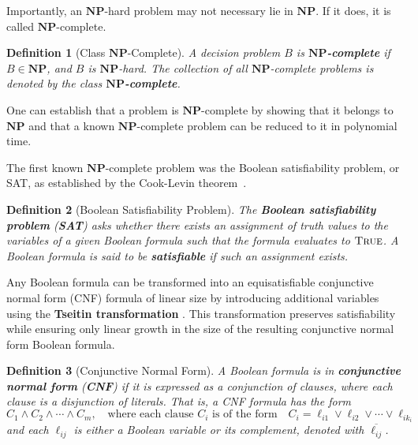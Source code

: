 \documentclass[11pt]{report}
\newtheorem{definition}{Definition}[section]
\begin{document}
Importantly, an $\mathbf{NP}$-hard problem may not necessary lie in $\mathbf{NP}$. If it does, it is called $\mathbf{NP}$-complete. 

\begin{definition}[Class $\mathbf{NP}$-Complete] \label{def::class_np_complete}
  A decision problem $B$ is \textbf{$\mathbf{NP}$-complete} if $B \in \mathbf{NP}$, and $B$ is $\mathbf{NP}$-hard. The collection of all $\mathbf{NP}$-complete problems is denoted by the class \textbf{$\mathbf{NP}$-complete}.
\end{definition}

One can establish that a problem is $\mathbf{NP}$-complete by showing that it belongs to $\mathbf{NP}$ and that a known $\mathbf{NP}$-complete problem can be reduced to it in polynomial time. 

The first known $\mathbf{NP}$-complete problem was the Boolean satisfiability problem, or SAT, as established by the Cook-Levin theorem~\cite{cook_1971_complexity}. 

\begin{definition}[Boolean Satisfiability Problem] \label{def::SAT}
  The \textbf{Boolean satisfiability problem} (\textbf{SAT}) asks whether there exists an assignment of truth values to the variables of a given Boolean formula such that the formula evaluates to $\textsc{True}$. A Boolean formula is said to be \textbf{satisfiable} if such an assignment exists.
\end{definition}

Any Boolean formula can be transformed into an equisatisfiable conjunctive normal form (CNF) formula of linear size by introducing additional variables using the \textbf{Tseitin transformation} \cite{tseitin_1968_transformation}. This transformation preserves satisfiability while ensuring only linear growth in the size of the resulting conjunctive normal form Boolean formula.  

\begin{definition}[Conjunctive Normal Form]
\label{def::CNF}
  A Boolean formula is in \textbf{conjunctive normal form} (\textbf{CNF}) if it is expressed as a conjunction of clauses, where each clause is a disjunction of literals. That is, a CNF formula has the form
  \[
  C_1 \land C_2 \land \cdots \land C_m, \quad \text {where each clause $C_i$ is of the form} \quad C_i = \ell_{i1} \lor \ell_{i2} \lor \cdots \lor \ell_{ik_i}
  \]
  and each $\ell_{ij}$ is either a Boolean variable or its complement, denoted with $\overline{\ell_{ij}}$.
\end{definition}
\end{document}
